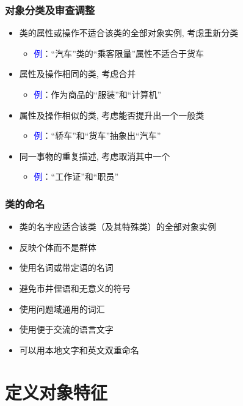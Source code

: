 \documentclass[compress]{beamer}
\begin{document}
\begin{frame}
  \frametitle{对象分类及审查调整}
  \begin{itemize}
    \item 类的属性或操作不适合该类的全部对象实例, 考虑重新分类
      \begin{itemize}
        \item \textcolor{blue}{例}：“汽车”类的“乘客限量”属性不适合于货车
      \end{itemize}
    \item 属性及操作相同的类, 考虑合并
      \begin{itemize}
        \item \textcolor{blue}{例}：作为商品的“服装”和“计算机”
      \end{itemize}
    \item 属性及操作相似的类, 考虑能否提升出一个一般类
      \begin{itemize}
        \item \textcolor{blue}{例}：“轿车”和“货车”抽象出“汽车”
      \end{itemize}
    \item 同一事物的重复描述, 考虑取消其中一个
      \begin{itemize}
        \item \textcolor{blue}{例}：“工作证”和“职员”
      \end{itemize}
  \end{itemize}
\end{frame}

\begin{frame}
  \frametitle{类的命名}
  \begin{itemize}
    \item 类的名字应适合该类（及其特殊类）的全部对象实例
    \item 反映个体而不是群体
    \item 使用名词或带定语的名词
    \item 避免市井俚语和无意义的符号
    \item 使用问题域通用的词汇
    \item 使用便于交流的语言文字
    \item 可以用本地文字和英文双重命名

  \end{itemize}

\end{frame}


\section{定义对象特征}
\end{document}
